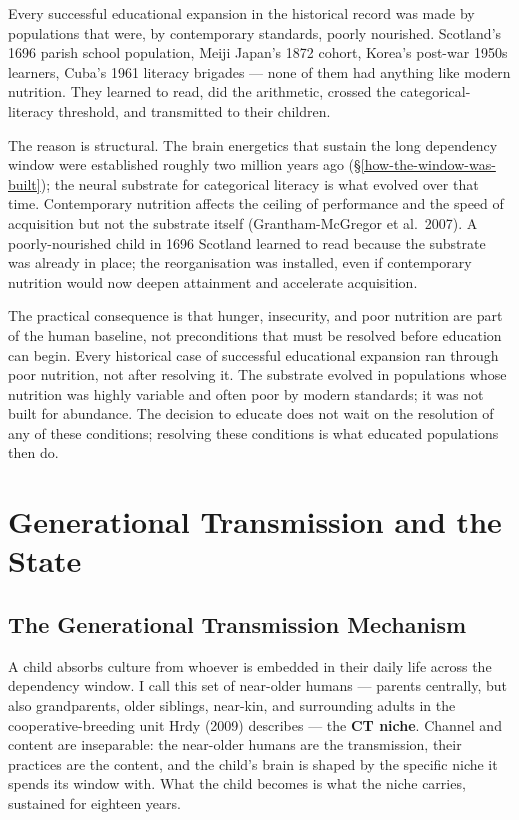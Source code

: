 \documentclass[12pt,letterpaper]{article}
\begin{document}
Every successful educational expansion in the historical record was
made by populations that were, by contemporary standards, poorly
nourished. Scotland's 1696 parish school population, Meiji Japan's
1872 cohort, Korea's post-war 1950s learners, Cuba's 1961 literacy
brigades --- none of them had anything like modern nutrition. They
learned to read, did the arithmetic, crossed the categorical-literacy
threshold, and transmitted to their children.

The reason is structural. The brain energetics that sustain the long
dependency window were established roughly two million years ago
(\S\ref{how-the-window-was-built}); the neural substrate for
categorical literacy is what evolved over that time. Contemporary
nutrition affects the ceiling of performance and the speed of
acquisition but not the substrate itself
(Grantham-McGregor et al.\ 2007). A poorly-nourished child in 1696
Scotland learned to read because the substrate was already in place;
the reorganisation was installed, even if contemporary nutrition
would now deepen attainment and accelerate acquisition.

The practical consequence is that hunger, insecurity, and poor
nutrition are part of the human baseline, not preconditions that
must be resolved before education can begin. Every historical case of
successful educational expansion ran through poor nutrition, not
after resolving it. The substrate evolved in populations whose
nutrition was highly variable and often poor by modern standards;
it was not built for abundance. The decision to educate does not wait
on the resolution of any of these conditions; resolving these
conditions is what educated populations then do.

\section{Generational Transmission and the State}\label{generational-transmission-and-state}

\subsection{The Generational Transmission Mechanism}\label{the-generational-transmission-mechanism}

A child absorbs culture from whoever is embedded in their daily life
across the dependency window. I call
this set of near-older humans --- parents centrally, but also
grandparents, older siblings, near-kin, and surrounding adults in the
cooperative-breeding unit Hrdy (2009) describes --- the
\textbf{CT niche}. Channel and content are inseparable: the near-older
humans are the transmission, their practices are the content, and the
child's brain is shaped by the specific niche it spends its window
with. What the child becomes is what the niche carries, sustained for
eighteen years.
\end{document}

